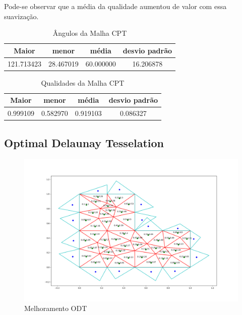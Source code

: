 Pode-se observar que a média da qualidade aumentou de valor com essa suavização.

\begin{table}[hb]
\centering
\par\caption{Ângulos da Malha CPT}
\begin{tabular}{c|c|c|c}
Maior&menor&média&desvio padrão\\\hline\hline
121.713423&28.467019&60.000000&16.206878\\\hline
\end{tabular}
\label{tab:angulos-malha-cpt}
\end{table}

\begin{table}[hb]
\centering
\par\caption{Qualidades da Malha CPT}
\begin{tabular}{c|c|c|c}
Maior&menor&média&desvio padrão\\\hline\hline
0.999109&0.582970&0.919103&0.086327	\\\hline
\end{tabular}
\label{tab:qualidades-malha-cpt}
\end{table}

\newpage
\subsection{Optimal Delaunay Tesselation}

\begin{figure}[ht]
    \centering
    \includegraphics[width=1\linewidth]{fig/malha-odt.png}
    \caption{Melhoramento ODT}
    \label{fig:malha-odt}
\end{figure}


